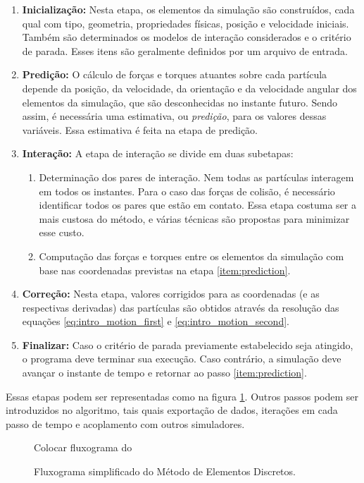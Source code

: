\begin{enumerate} 
	\item \textbf{Inicialização:} Nesta etapa, os elementos da simulação são construídos, cada qual com tipo, geometria, propriedades físicas, posição e velocidade iniciais. Também são determinados os modelos de interação considerados e o critério de parada. Esses itens são geralmente definidos por um arquivo de entrada. 
	\item \textbf{Predição:} O cálculo de forças e torques atuantes sobre cada partícula depende da posição, da velocidade, da orientação e da velocidade angular dos elementos da simulação, que são desconhecidas no instante futuro. Sendo assim, é necessária uma estimativa, ou \textit{predição}, para os valores dessas variáveis. Essa estimativa é feita na etapa de predição. \label{item:prediction} 
	\item \textbf{Interação:} A etapa de interação se divide em duas subetapas: 
	\begin{enumerate} 
		\item Determinação dos pares de interação. Nem todas as partículas interagem em todos os instantes. Para o caso das forças de colisão, é necessário identificar todos os pares que estão em contato. Essa etapa costuma ser a mais custosa do método, e várias técnicas são propostas para minimizar esse custo. 
		\item Computação das forças e torques entre os elementos da simulação com base nas coordenadas previstas na etapa \ref{item:prediction}. 
	\end{enumerate} 
	\item \textbf{Correção:} Nesta etapa, valores corrigidos para as coordenadas (e as respectivas derivadas) das partículas são obtidos através da resolução das equações \eqref{eq:intro_motion_first} e \eqref{eq:intro_motion_second}. 
	\item \textbf{Finalizar:} Caso o critério de parada previamente estabelecido seja atingido, o programa deve terminar sua execução. Caso contrário, a simulação deve avançar o instante de tempo e retornar ao passo \ref{item:prediction}. 
\end{enumerate} 

Essas etapas podem ser representadas como na figura \ref{fig:simple_dem_algorithm}. Outros passos podem ser introduzidos no algoritmo, tais quais exportação de dados, iterações em cada passo de tempo e acoplamento com outros simuladores.

\begin{figure}[h]
	\caption{Fluxograma simplificado do Método de Elementos Discretos.}
	\centering
		\alert{Colocar fluxograma do \DEM{}}
	\label{fig:simple_dem_algorithm}
\end{figure}

